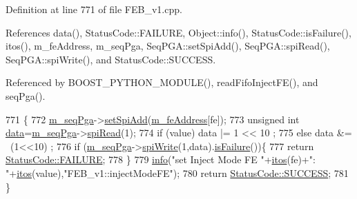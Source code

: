 Definition at line 771 of file F\+E\+B\+\_\+v1.\+cpp.



References data(), Status\+Code\+::\+F\+A\+I\+L\+U\+RE, Object\+::info(), Status\+Code\+::is\+Failure(), itos(), m\+\_\+fe\+Address, m\+\_\+seq\+Pga, Seq\+P\+G\+A\+::set\+Spi\+Add(), Seq\+P\+G\+A\+::spi\+Read(), Seq\+P\+G\+A\+::spi\+Write(), and Status\+Code\+::\+S\+U\+C\+C\+E\+SS.



Referenced by B\+O\+O\+S\+T\+\_\+\+P\+Y\+T\+H\+O\+N\+\_\+\+M\+O\+D\+U\+L\+E(), read\+Fifo\+Inject\+F\+E(), and seq\+Pga().


\begin{DoxyCode}
771                                                       \{
772   \hyperlink{classFEB__v1_a6c7804ac86796f233a8393043adf2e77}{m\_seqPga}->\hyperlink{classSeqPGA_ac998ce3a6d9b5f2e88cc8393f8c1df53}{setSpiAdd}(\hyperlink{classFEB__v1_a4e1945c2d5b434125f375e9d0fc6d99f}{m\_feAddress}[fe]);
773   \textcolor{keywordtype}{unsigned} \textcolor{keywordtype}{int} \hyperlink{classFEB__v1_a6bca4320bd3bbbc32efc81097f33421a}{data}=\hyperlink{classFEB__v1_a6c7804ac86796f233a8393043adf2e77}{m\_seqPga}->\hyperlink{classSeqPGA_ab3d0e5e5d4014bc7a92588a76b8713d4}{spiRead}(1);
774   \textcolor{keywordflow}{if} (value)  data |= 1 << 10 ;
775   \textcolor{keywordflow}{else}        data &= ~(1<<10) ;
776   \textcolor{keywordflow}{if} (\hyperlink{classFEB__v1_a6c7804ac86796f233a8393043adf2e77}{m\_seqPga}->\hyperlink{classSeqPGA_ad4421841ce4ce8b88ad13f63216f0743}{spiWrite}(1,data).\hyperlink{classStatusCode_a5dd22dc6eb2c52fc4cabc58f6dea2eb7}{isFailure}())\{
777     \textcolor{keywordflow}{return} \hyperlink{classStatusCode_a6f565cbeadc76d14c72f047e5e85eb4ba3da73d4c469762eb9d3c960368252b26}{StatusCode::FAILURE};
778   \}
779   \hyperlink{classObject_a644fd329ea4cb85f54fa6846484b84a8}{info}(\textcolor{stringliteral}{"set Inject Mode FE "}+\hyperlink{Tools_8h_af330027dbdafb9a30768b3613c553e60}{itos}(fe)+\textcolor{stringliteral}{": "}+\hyperlink{Tools_8h_af330027dbdafb9a30768b3613c553e60}{itos}(value),\textcolor{stringliteral}{"FEB\_v1::injectModeFE"});
780   \textcolor{keywordflow}{return} \hyperlink{classStatusCode_a6f565cbeadc76d14c72f047e5e85eb4badd0da38d3ba0d922efd1f4619bc37ad8}{StatusCode::SUCCESS};
781 \}
\end{DoxyCode}
\mbox{\label{classFEB__v1_ae3252ed2737b5c93395da201b427b871}} 
